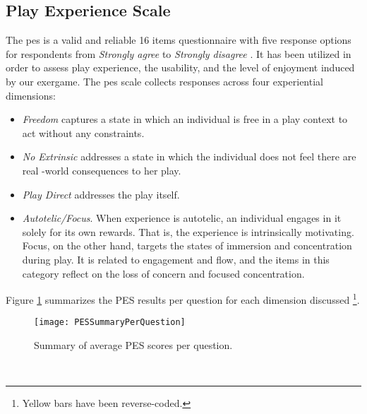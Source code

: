 \subsection{Play Experience Scale}
The \acrfull{pes} is a valid and reliable 16 items questionnaire with five response options for respondents from \textit{Strongly agree} to \textit{Strongly disagree} \cite{pavlas2012play}. It has been utilized in order to assess play experience, the usability, and the level of enjoyment induced by our exergame. The \gls{pes} scale collects responses across four experiential dimensions: \begin{itemize}
\item \textit{Freedom} captures a state in which an individual is free in a play context to act without any constraints. 
\item \textit{No Extrinsic} addresses a state in which the individual does not feel there are real -world consequences to her play.
\item \textit{Play Direct} addresses the play itself.
\item \textit{Autotelic/Focus}. When experience is autotelic, an individual engages in it solely for its own rewards. That is, the experience is intrinsically motivating.  Focus, on the other hand, targets the states of immersion and concentration during play. It is related to engagement and flow, and the items in this category reflect on the loss of concern and focused concentration.
\end{itemize}
Figure \ref{fig:pesPerQuestion} summarizes the PES results per question for each dimension discussed \footnote{Yellow bars have been reverse-coded.}.
\begin{figure}[h]
    \centering
    \texttt{[image: PESSummaryPerQuestion]}
    \caption{Summary of average PES scores per question.}
    \label{fig:pesPerQuestion}
\end{figure}\\
